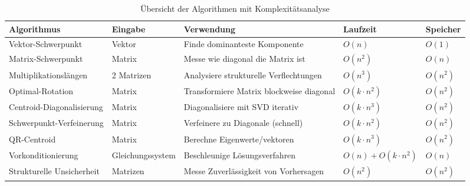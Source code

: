 \documentclass[a4paper,12pt]{article}
\begin{document}
\begin{table}
    \centering
    \vfill
    \begin{tabular}{|l|l|l|l|l|}
        \hline
        \textbf{Algorithmus} & \textbf{Eingabe} & \textbf{Verwendung} & \textbf{Laufzeit} & \textbf{Speicher} \\
        \hline
        Vektor-Schwerpunkt & Vektor & Finde dominanteste Komponente & $O(n)$ & $O(1)$ \\
        Matrix-Schwerpunkt & Matrix & Messe wie diagonal die Matrix ist & $O(n^2)$ & $O(n)$ \\
        Multiplikationslängen & 2 Matrizen & Analysiere strukturelle Verflechtungen & $O(n^3)$ & $O(n^2)$ \\
        Optimal-Rotation & Matrix & Transformiere Matrix blockweise diagonal & $O(k \cdot n^2)$ & $O(n^2)$ \\
        Centroid-Diagonalisierung & Matrix & Diagonalisiere mit SVD iterativ & $O(k \cdot n^3)$ & $O(n^2)$ \\
        Schwerpunkt-Verfeinerung & Matrix & Verfeinere zu Diagonale (schnell) & $O(k \cdot n^2)$ & $O(n^2)$ \\
        QR-Centroid & Matrix & Berechne Eigenwerte/vektoren & $O(k \cdot n^3)$ & $O(n^2)$ \\
        Vorkonditionierung & Gleichungssystem & Beschleunige Lösungsverfahren & $O(n) + O(k \cdot n^2)$ & $O(n)$ \\
        Strukturelle Unsicherheit & Matrizen & Messe Zuverlässigkeit von Vorhersagen & $O(n^2)$ & $O(n^2)$ \\
        \hline
    \end{tabular}
    \caption{Übersicht der Algorithmen mit Komplexitätsanalyse}
    \label{tab:overview}
    \vfill
\end{table}
\end{document}
